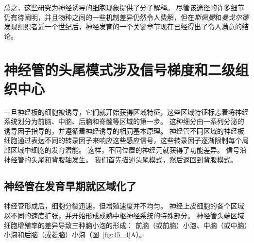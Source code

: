 总之，这些研究为神经诱导的细胞现象提供了分子解释。
尽管该途径的许多细节仍有待阐明，并且物种之间的一些机制差异仍然令人费解，但在\textit{斯佩曼}和\textit{曼戈尔德}发现组织者近一个世纪后，神经发育的一个关键章节现在已经得出了令人满意的结论。



\section{神经管的头尾模式涉及信号梯度和二级组织中心}

一旦神经板的细胞被诱导，它们就开始获得区域特征，这些区域特征标志着将神经系统划分为前脑、中脑、后脑和脊髓等区域的第一步。
这种细分由一系列分泌的诱导因子指导的，并遵循着神经诱导的相同基本原理。
神经管不同区域的神经板细胞通过表达不同的转录因子来响应这些感应信号，这些转录因子逐渐限制每个局部区域中细胞的发育潜能。
这样，不同位置的神经元就获得了功能差异。
信号沿神经管的头尾和背腹轴发生。
我们首先描述头尾模式，然后返回到背腹模式。



\subsection{神经管在发育早期就区域化了}

神经管形成后，细胞分裂迅速，但增殖速度并不均匀。
神经上皮细胞的各个区域以不同的速度扩张，并开始形成成熟中枢神经系统的特殊部分。
神经管头端区域细胞增殖率的差异导致三种脑小泡的形成：
前脑（或前脑）小泡、中脑（或中脑）小泡和后脑（或菱脑）小泡（图~\ref{fig:45_4}A）。


